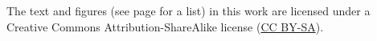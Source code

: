\begin{fullwidth}
\vspace{.5cm}
\noindent
\textcolor{black!80!white}{
The text and figures (see page \pageref{sec:lists} for a list) in this 
work are
licensed under a Creative Commons Attribution-ShareAlike license 
(\href{https://creativecommons.org/licenses/by-sa/4.0/}{CC BY-SA}).
} %
\end{fullwidth}
%

\ifdefined\releasemode\else
\begin{fullwidth} \listoftodos \end{fullwidth}
\fi

\begin{fullwidth}
\tableofcontents
\end{fullwidth}

\normalsize%
\normalfont%